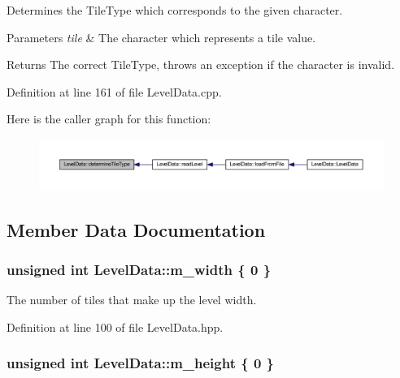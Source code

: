 Determines the Tile\+Type which corresponds to the given character. 


\begin{DoxyParams}{Parameters}
{\em tile} & The character which represents a tile value. \\
\hline
\end{DoxyParams}
\begin{DoxyReturn}{Returns}
The correct Tile\+Type, throws an exception if the character is invalid. 
\end{DoxyReturn}


Definition at line 161 of file Level\+Data.\+cpp.



Here is the caller graph for this function\+:
\nopagebreak
\begin{figure}[H]
\begin{center}
\leavevmode
\includegraphics[width=350pt]{classLevelData_a22aa59bed8da92af1921066eeef30a19_icgraph}
\end{center}
\end{figure}




\subsection{Member Data Documentation}
\hypertarget{classLevelData_af2aaac4914ff63edf43f93592e117abf}{
\subsubsection[{m\+\_\+width}]{\setlength{\rightskip}{0pt plus 5cm}unsigned int Level\+Data\+::m\+\_\+width \{ 0 \}\hspace{0.3cm}{\ttfamily [private]}}}\label{classLevelData_af2aaac4914ff63edf43f93592e117abf}


The number of tiles that make up the level width. 



Definition at line 100 of file Level\+Data.\+hpp.

\hypertarget{classLevelData_af6895162dbf2aae99d81f2bd39bfd0fc}{
\subsubsection[{m\+\_\+height}]{\setlength{\rightskip}{0pt plus 5cm}unsigned int Level\+Data\+::m\+\_\+height \{ 0 \}\hspace{0.3cm}{\ttfamily [private]}}}\label{classLevelData_af6895162dbf2aae99d81f2bd39bfd0fc}


